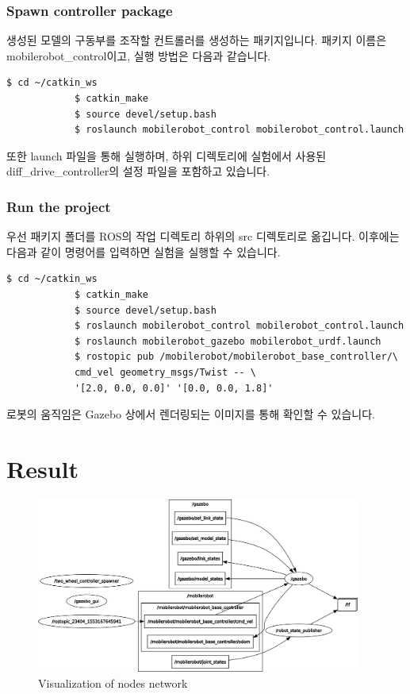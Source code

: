 \documentclass{article}
\begin{document}
			\subsubsection{Spawn controller package}
			생성된 모델의 구동부를 조작할 컨트롤러를 생성하는 패키지입니다. 패키지 이름은 mobilerobot\_control이고, 실행 방법은 다음과 같습니다.
			\begin{lstlisting}[autogobble=true, frame=single]
			$ cd ~/catkin_ws
			$ catkin_make
			$ source devel/setup.bash
			$ roslaunch mobilerobot_control mobilerobot_control.launch
			\end{lstlisting}
			또한 launch 파일을 통해 실행하며, 하위 디렉토리에 실험에서 사용된 diff\_drive\_controller의 설정 파일을 포함하고 있습니다.
			
			\subsubsection{Run the project}
			우선 패키지 폴더를 ROS의 작업 디렉토리 하위의 src 디렉토리로 옮깁니다. 이후에는 다음과 같이 명령어를 입력하면 실험을 실행할 수 있습니다.
			\begin{lstlisting}[autogobble=true, frame=single]
			$ cd ~/catkin_ws
			$ catkin_make
			$ source devel/setup.bash
			$ roslaunch mobilerobot_control mobilerobot_control.launch
			$ roslaunch mobilerobot_gazebo mobilerobot_urdf.launch
			$ rostopic pub /mobilerobot/mobilerobot_base_controller/\
			cmd_vel geometry_msgs/Twist -- \
			'[2.0, 0.0, 0.0]' '[0.0, 0.0, 1.8]'
			\end{lstlisting}
			로봇의 움직임은 Gazebo 상에서 렌더링되는 이미지를 통해 확인할 수 있습니다.
		
	\section{Result}
	\begin{figure}[b!]
		\centering
		\includegraphics[width=0.95\textwidth]{figures/rqt_graph.png}
		\caption{\label{fig:rqt_graph}Visualization of nodes network}
	\end{figure}
		
\end{document}
